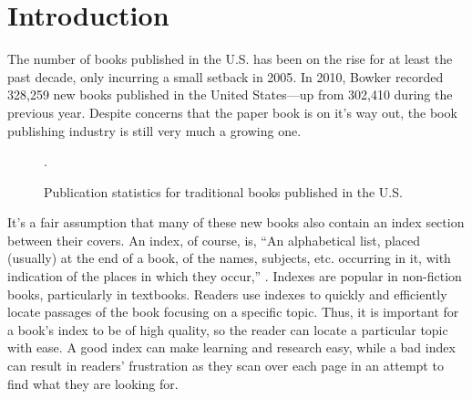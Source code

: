 \section{Introduction}

The number of books published in the U.S. has been on the rise for at least the past decade, only incurring a small setback in 2005\cite{bowker}.
In 2010, Bowker recorded 328,259 new books published in the United States---up from 302,410 during the previous year.
Despite concerns that the paper book is on it's way out, the book publishing industry is still very much a growing one.

\begin{center}
\begin{figure}[H]
\label{fig:new-books}
\caption{Publication statistics for traditional books published in the U.S.\cite{bowker}}.
\end{figure}
\end{center}

It's a fair assumption that many of these new books also contain an index section between their covers.
An index, of course, is, ``An alphabetical list, placed (usually) at the end of a book, of the names, subjects, etc. occurring in it, with indication of the places in which they occur,'' \cite{oed-index}.
Indexes are popular in non-fiction books, particularly in textbooks.
Readers use indexes to quickly and efficiently locate passages of the book focusing on a specific topic.
Thus, it is important for a book's index to be of high quality, so the reader can locate a particular topic with ease.
A good index can make learning and research easy, while a bad index can result in readers' frustration as they scan over each page in an attempt to find what they are looking for.

